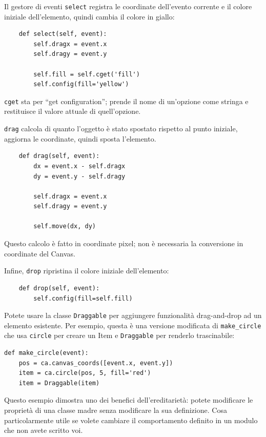 \documentclass[10pt]{book}
\begin{document}
Il gestore di eventi {\tt select} registra le coordinate dell'evento corrente e il colore iniziale dell'elemento, quindi cambia il colore in giallo:

\begin{verbatim}
    def select(self, event):
        self.dragx = event.x
        self.dragy = event.y

        self.fill = self.cget('fill')
        self.config(fill='yellow')
\end{verbatim}
%
{\tt cget} sta per ``get configuration''; prende il nome di un'opzione come stringa e restituisce il valore attuale di quell'opzione. 

{\tt drag} calcola di quanto l'oggetto è stato spostato rispetto al punto iniziale, aggiorna le coordinate, quindi sposta l'elemento.

\begin{verbatim}
    def drag(self, event):
        dx = event.x - self.dragx
        dy = event.y - self.dragy

        self.dragx = event.x
        self.dragy = event.y

        self.move(dx, dy)
\end{verbatim}
%
Questo calcolo è fatto in coordinate pixel; non è necessaria la conversione in coordinate del Canvas.

Infine, {\tt drop} ripristina il colore iniziale dell'elemento:

\begin{verbatim}
    def drop(self, event):
        self.config(fill=self.fill)
\end{verbatim}
%
Potete usare la classe {\tt Draggable} per aggiungere funzionalità drag-and-drop ad un elemento esistente. Per esempio, questa è una versione modificata di \verb"make_circle" che usa {\tt circle} per creare un Item e {\tt Draggable} per renderlo trascinabile:

\begin{verbatim}
def make_circle(event):
    pos = ca.canvas_coords([event.x, event.y])
    item = ca.circle(pos, 5, fill='red')
    item = Draggable(item)
\end{verbatim}
%
Questo esempio dimostra uno dei benefici dell'ereditarietà: potete modificare le proprietà di una classe madre senza modificare la sua definizione. Cosa particolarmente utile se volete cambiare il comportamento definito in un modulo che non avete scritto voi.
\end{document}
